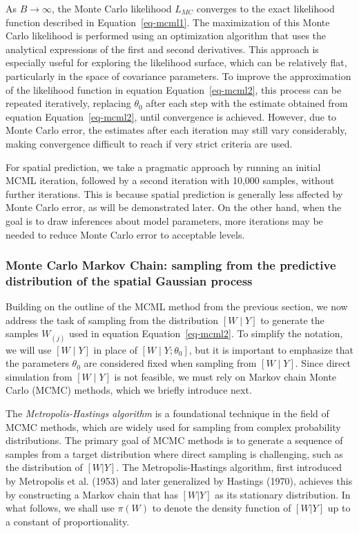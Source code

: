 \documentclass[
  letterpaper,
]{krantz}
\begin{document}
As \(B \rightarrow \infty\), the Monte Carlo likelihood \(L_{MC}\)
converges to the exact likelihood function described in
Equation~\ref{eq-mcml1}. The maximization of this Monte Carlo likelihood
is performed using an optimization algorithm that uses the analytical
expressions of the first and second derivatives. This approach is
especially useful for exploring the likelihood surface, which can be
relatively flat, particularly in the space of covariance parameters. To
improve the approximation of the likelihood function in equation
Equation~\ref{eq-mcml2}, this process can be repeated iteratively,
replacing \(\theta_0\) after each step with the estimate obtained from
equation Equation~\ref{eq-mcml2}, until convergence is achieved.
However, due to Monte Carlo error, the estimates after each iteration
may still vary considerably, making convergence difficult to reach if
very strict criteria are used.

For spatial prediction, we take a pragmatic approach by running an
initial MCML iteration, followed by a second iteration with 10,000
samples, without further iterations. This is because spatial prediction
is generally less affected by Monte Carlo error, as will be demonstrated
later. On the other hand, when the goal is to draw inferences about
model parameters, more iterations may be needed to reduce Monte Carlo
error to acceptable levels.

\subsubsection{Monte Carlo Markov Chain: sampling from the predictive
distribution of the spatial Gaussian process}\label{sec-mcmc-mala}

Building on the outline of the MCML method from the previous section, we
now address the task of sampling from the distribution \([W \mid Y]\) to
generate the samples \(W_{(j)}\) used in equation
Equation~\ref{eq-mcml2}. To simplify the notation, we will use
\([W \mid Y]\) in place of \([W \mid Y; \theta_0]\), but it is important
to emphasize that the parameters \(\theta_0\) are considered fixed when
sampling from \([W \mid Y]\). Since direct simulation from
\([W \mid Y]\) is not feasible, we must rely on Markov chain Monte Carlo
(MCMC) methods, which we briefly introduce next.

The \textit{Metropolis-Hastings algorithm} is a foundational technique
in the field of MCMC methods, which are widely used for sampling from
complex probability distributions. The primary goal of MCMC methods is
to generate a sequence of samples from a target distribution where
direct sampling is challenging, such as the distribution of \([W | Y]\).
The Metropolis-Hastings algorithm, first introduced by Metropolis et al.
(1953) and later generalized by Hastings (1970), achieves this by
constructing a Markov chain that has \([W | Y]\) as its stationary
distribution. In what follows, we shall use \(\pi(W)\) to denote the
density function of \([W | Y]\) up to a constant of proportionality.
\end{document}

